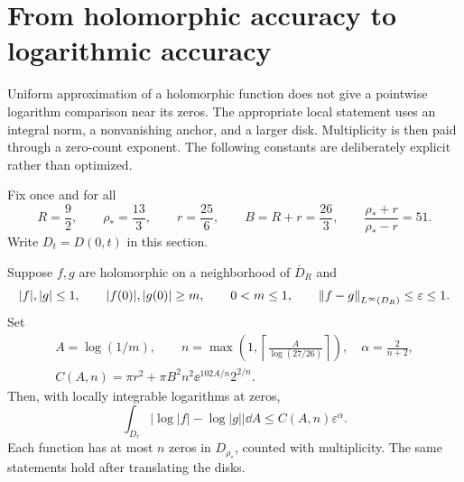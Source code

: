 \section{From holomorphic accuracy to logarithmic accuracy}\label{sec:logarithms}

Uniform approximation of a holomorphic function does not give a
pointwise logarithm comparison near its zeros. The appropriate local
statement uses an integral norm, a nonvanishing anchor, and a larger
disk. Multiplicity is then paid through a zero-count exponent.
The following constants are deliberately explicit rather than
optimized.

Fix once and for all
\begin{equation}\label{eq:radii}
 R=\frac92,\qquad \rho_*=\frac{13}3,\qquad r=\frac{25}6,
 \qquad B=R+r=\frac{26}3,\qquad
 \frac{\rho_*+r}{\rho_*-r}=51 .
\end{equation}
Write $D_t=D(0,t)$ in this section.

\begin{theorem}\label{thm:log}
Suppose $f,g$ are holomorphic on a neighborhood of $\overline D_R$ and
\[
 |f|,|g|\le1,\qquad |f(0)|,|g(0)|\ge m,\qquad
 0<m\le1,\qquad \left\|f-g\right\|_{L^\infty(D_R)}\le\varepsilon\le1 .
\]
Set
\begin{equation}\label{eq:local-constants}
 \begin{gathered}
 A=\log(1/m),\qquad
 n=\max\!\left(1,\left\lceil\frac{A}{\log(27/26)}\right\rceil\right),
 \quad \alpha=\frac2{n+2},\\
 C(A,n)=\pi r^2+\pi B^2n^2\ee^{102A/n}2^{2/n}.
 \end{gathered}
\end{equation}
Then, with locally integrable logarithms at zeros,
\begin{equation}\label{eq:log-transfer}
 \int_{D_r}\left|\log|f|-\log|g|\right|\dd A
 \le C(A,n)\varepsilon^\alpha .
\end{equation}
Each function has at most $n$ zeros in $D_{\rho_*}$, counted with
multiplicity. The same statements hold after translating the disks.
\end{theorem}

